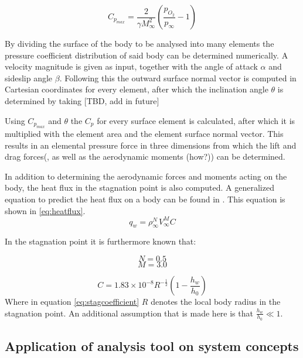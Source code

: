 \begin{equation}
C_{p_{max}}=\frac{2}{\gamma M_{\infty}^{2}}\left(\frac{p_{O_{2}}}{p_{\infty}}-1\right)
\label{eq:cpmaxfinal}
\end{equation}

By dividing the surface of the body to be analysed into many elements the pressure coefficient distribution of said body can be determined numerically. A velocity magnitude is given as input, together with the angle of attack $\alpha$ and sideslip angle $\beta$. Following this the outward surface normal vector is computed in Cartesian coordinates for every element, after which the inclination angle $\theta$ is determined by taking [TBD, add in future] 

Using $C_{p_{max}}$ and $\theta$ the $C_{p}$ for every surface element is calculated, after which it is multiplied with the element area and the element surface normal vector. This results in an elemental pressure force in three dimensions from which the lift and drag forces(, as well as the aerodynamic moments (how?)) can be determined. 

In addition to determining the aerodynamic forces and moments acting on the body, the heat flux in the stagnation point is also computed. A generalized equation to predict the heat flux on a body can be found in \cite{AndersonJr.2006}. This equation is shown in \ref{eq:heatflux}.
\begin{equation}
q_{w}=\rho_{\infty}^{N}V_{\infty}^{M}C
\label{eq:heatflux}
\end{equation}

In the stagnation point it is furthermore known that: 
\begin{multicols}{2}
\begin{equation}
\label{eq:stagdens}
N=0.5
\end{equation} \break
\begin{equation}
\label{eq:stagspeed}
M=3.0
\end{equation}
\end{multicols}
\begin{equation}
\label{eq:stagcoefficient}
C=1.83 \times 10^{-8} R^{-\frac{1}{2}}\left(1-\frac{h_{w}}{h_{0}}\right)
\end{equation}
Where in equation \ref{eq:stagcoefficient} $R$ denotes the local body radius in the stagnation point. An additional assumption that is made here is that $\frac{h_{w}}{h_{0}}\ll 1$.

\subsection{Application of analysis tool on system concepts}
\label{subsec:appaeroanal}